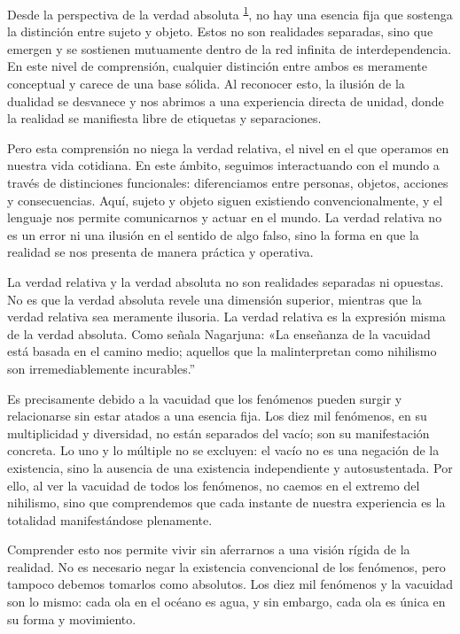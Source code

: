 \documentclass[
  a5paperpaper,
]{article}
\begin{document}
Desde la perspectiva de la verdad absoluta
\textsuperscript{\protect\hypertarget{ref1}{\protect\hyperlink{nota1}{1}}},
no hay una esencia fija que sostenga la distinción entre sujeto y
objeto. Estos no son realidades separadas, sino que emergen y se
sostienen mutuamente dentro de la red infinita de interdependencia. En
este nivel de comprensión, cualquier distinción entre ambos es meramente
conceptual y carece de una base sólida. Al reconocer esto, la ilusión de
la dualidad se desvanece y nos abrimos a una experiencia directa de
unidad, donde la realidad se manifiesta libre de etiquetas y
separaciones.

Pero esta comprensión no niega la verdad relativa, el nivel en el que
operamos en nuestra vida cotidiana. En este ámbito, seguimos
interactuando con el mundo a través de distinciones funcionales:
diferenciamos entre personas, objetos, acciones y consecuencias. Aquí,
sujeto y objeto siguen existiendo convencionalmente, y el lenguaje nos
permite comunicarnos y actuar en el mundo. La verdad relativa no es un
error ni una ilusión en el sentido de algo falso, sino la forma en que
la realidad se nos presenta de manera práctica y operativa.

La verdad relativa y la verdad absoluta no son realidades separadas ni
opuestas. No es que la verdad absoluta revele una dimensión superior,
mientras que la verdad relativa sea meramente ilusoria. La verdad
relativa es la expresión misma de la verdad absoluta. Como señala
Nagarjuna: «La enseñanza de la vacuidad está basada en el camino medio;
aquellos que la malinterpretan como nihilismo son irremediablemente
incurables.''

Es precisamente debido a la vacuidad que los fenómenos pueden surgir y
relacionarse sin estar atados a una esencia fija. Los diez mil
fenómenos, en su multiplicidad y diversidad, no están separados del
vacío; son su manifestación concreta. Lo uno y lo múltiple no se
excluyen: el vacío no es una negación de la existencia, sino la ausencia
de una existencia independiente y autosustentada. Por ello, al ver la
vacuidad de todos los fenómenos, no caemos en el extremo del nihilismo,
sino que comprendemos que cada instante de nuestra experiencia es la
totalidad manifestándose plenamente.

Comprender esto nos permite vivir sin aferrarnos a una visión rígida de
la realidad. No es necesario negar la existencia convencional de los
fenómenos, pero tampoco debemos tomarlos como absolutos. Los diez mil
fenómenos y la vacuidad son lo mismo: cada ola en el océano es agua, y
sin embargo, cada ola es única en su forma y movimiento.
\end{document}

